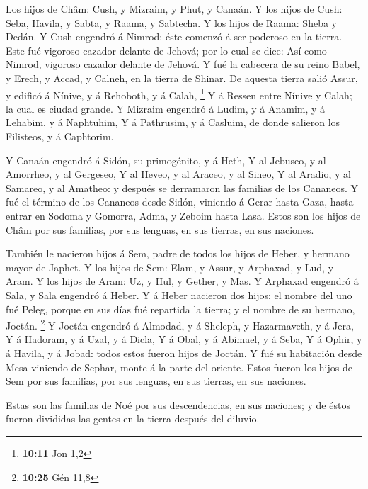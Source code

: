  Los hijos de Châm: Cush, y Mizraim, y Phut, y Canaán.
 Y los hijos de Cush: Seba, Havila, y Sabta, y Raama, y
Sabtecha. Y los hijos de Raama: Sheba y Dedán.  Y Cush
engendró á Nimrod: éste comenzó á ser poderoso en la tierra.
 Este fué vigoroso cazador delante de Jehová; por lo cual
se dice: Así como Nimrod, vigoroso cazador delante de Jehová.
 Y fué la cabecera de su reino Babel, y Erech, y Accad, y
Calneh, en la tierra de Shinar.  De aquesta tierra salió
Assur, y edificó á Nínive, y á Rehoboth, y á Calah, \footnote{\textbf{10:11}
  Jon 1,2}  Y á Ressen entre Nínive y Calah; la cual es
ciudad grande.  Y Mizraim engendró á Ludim, y á Anamim, y
á Lehabim, y á Naphtuhim,  Y á Pathrusim, y á Casluim, de
donde salieron los Filisteos, y á Caphtorim.

 Y Canaán engendró á Sidón, su primogénito, y á Heth,
 Y al Jebuseo, y al Amorrheo, y al Gergeseo,
 Y al Heveo, y al Araceo, y al Sineo,  Y
al Aradio, y al Samareo, y al Amatheo: y después se derramaron las
familias de los Cananeos.  Y fué el término de los
Cananeos desde Sidón, viniendo á Gerar hasta Gaza, hasta entrar en
Sodoma y Gomorra, Adma, y Zeboim hasta Lasa.  Estos son
los hijos de Châm por sus familias, por sus lenguas, en sus tierras, en
sus naciones.

 También le nacieron hijos á Sem, padre de todos los
hijos de Heber, y hermano mayor de Japhet.  Y los hijos
de Sem: Elam, y Assur, y Arphaxad, y Lud, y Aram.  Y los
hijos de Aram: Uz, y Hul, y Gether, y Mas.  Y Arphaxad
engendró á Sala, y Sala engendró á Heber.  Y á Heber
nacieron dos hijos: el nombre del uno fué Peleg, porque en sus días fué
repartida la tierra; y el nombre de su hermano, Joctán. \footnote{\textbf{10:25}
  Gén 11,8}  Y Joctán engendró á Almodad, y á Sheleph, y
Hazarmaveth, y á Jera,  Y á Hadoram, y á Uzal, y á Dicla,
 Y á Obal, y á Abimael, y á Seba,  Y á
Ophir, y á Havila, y á Jobad: todos estos fueron hijos de Joctán.
 Y fué su habitación desde Mesa viniendo de Sephar, monte
á la parte del oriente.  Estos fueron los hijos de Sem
por sus familias, por sus lenguas, en sus tierras, en sus naciones.

 Estas son las familias de Noé por sus descendencias, en
sus naciones; y de éstos fueron divididas las gentes en la tierra
después del diluvio.

